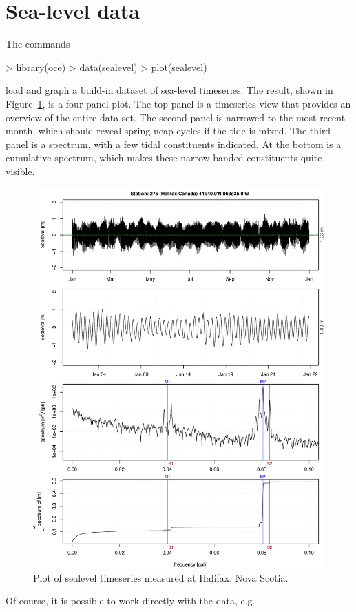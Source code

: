 \documentclass{article}
\begin{document}
\section{Sea-level data}

The commands
\begin{Schunk}
\begin{Sinput}
> library(oce)
> data(sealevel)
> plot(sealevel)
\end{Sinput}
\end{Schunk}
load and graph a build-in dataset of sea-level timeseries. The result, shown in
Figure~\ref{fig:sealevel}, is a four-panel plot. The top panel is a timeseries view that
provides an overview of the entire data set. The second panel is narrowed to the most recent
month, which should reveal spring-neap cycles if the tide is mixed. The third panel is a
spectrum, with a few tidal constituents indicated. At the bottom is a cumulative spectrum,
which makes these narrow-banded constituents quite visible.

\begin{figure}
\begin{center}
\includegraphics{oce-sealevelfig}
\end{center}
\caption{Plot of sealevel timeseries measured at Halifax, Nova Scotia.}
\label{fig:sealevel}
\end{figure}
Of course, it is possible to work directly with the data, e.g.
\begin{Schunk}
\end{Schunk}
\end{document}
